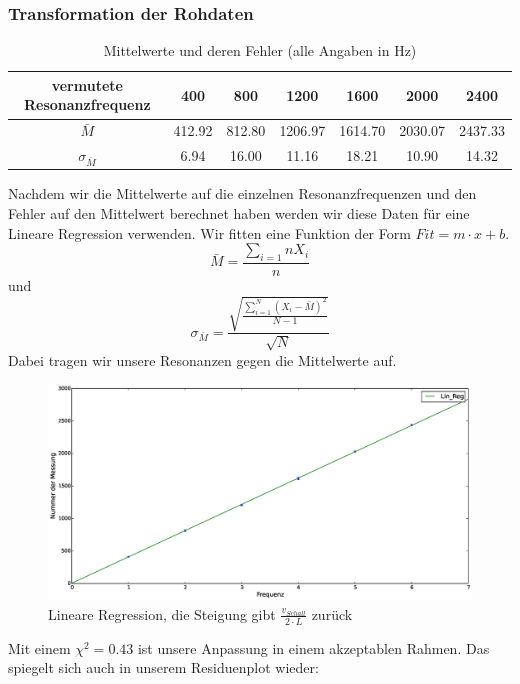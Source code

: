 \documentclass[12pt,a4paper]{article}
\begin{document}
\subsubsection{Transformation der Rohdaten}
\begin{table}[H]
\begin{tabular}{c|c|c|c|c|c|c}
vermutete Resonanzfrequenz & 400 & 800 & 1200 & 1600 & 2000 & 2400 \\ 
\hline 
$\bar{M}$ & 412.92 & 812.80 & 1206.97 & 1614.70 & 2030.07 & 2437.33 \\ 
\hline 
$\sigma_{\bar{M}}$ & 6.94 & 16.00 & 11.16 & 18.21 & 10.90 & 14.32 \\ 
\end{tabular}
\caption{Mittelwerte und deren Fehler (alle Angaben in Hz)} 
\end{table}
Nachdem wir die Mittelwerte auf die einzelnen Resonanzfrequenzen und den Fehler auf den Mittelwert  berechnet haben werden wir diese Daten für eine Lineare Regression verwenden. Wir fitten eine Funktion der Form $Fit = m\cdot x + b$.
\begin{equation}
\bar{M} = \frac{\sum_{i=1}{n}{X_i}}{n}
\end{equation}
und
\begin{equation}
\sigma_{\bar{M}} = \frac{\sqrt{\frac{\sum_{i=1}^{N}({X_i-\bar{M}})^2}{N-1}}}{\sqrt{N}}
\end{equation} 
Dabei tragen wir unsere Resonanzen gegen die Mittelwerte auf.
\begin{figure}[H]
\centering
\includegraphics[scale=0.3]{Bilder/linreg_variation.eps}
\caption{Lineare Regression, die Steigung gibt $\frac{v_{Schall}}{2\cdot L}$ zurück}
\end{figure}
Mit einem $\chi^2 = 0.43$ ist unsere Anpassung in einem akzeptablen Rahmen. Das spiegelt sich auch in unserem Residuenplot wieder:
\end{document}
